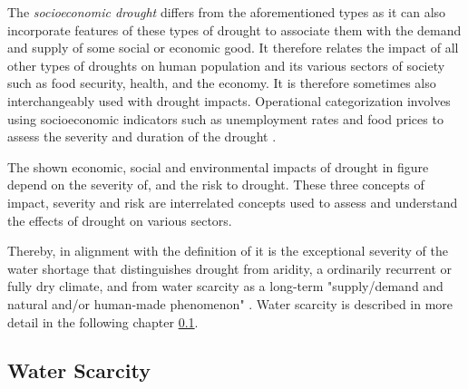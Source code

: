 The \textit{socioeconomic drought} differs from the aforementioned types as it can also incorporate features of these types of drought to associate them with the demand and supply of some social or economic good. It therefore relates the impact of all other types of droughts on human population and its various sectors of society such as food security, health, and the economy. It is therefore sometimes also interchangeably used with drought impacts. Operational categorization involves using socioeconomic indicators such as unemployment rates and food prices to assess the severity and duration of the drought \autocite{nationaldroughtmitigationcenterTypesDrought,wilhiteUnderstandingDroughtPhenomenon1985}.


The shown economic, social and environmental impacts of drought in figure  depend on the severity of, and the risk to drought. These three concepts of impact, severity and risk are interrelated concepts used to assess and understand the effects of drought on various sectors. 



Thereby, in alignment with the definition of \autocite{vanloonDroughtHumanmodifiedWorld2016} it is the exceptional severity of the water shortage that distinguishes drought from aridity, a ordinarily recurrent or fully dry climate, and from water scarcity as a long-term "supply/demand and natural and/or human-made phenomenon" \autocites[7]{idmpDroughtWaterScarcity2022}{vereintenationenSpecialReportDrought2021, vanClimatologicalRiskDroughts2017}. Water scarcity is described in more detail in the following chapter \ref*{subsec:water_scarcity}.



\subsection{Water Scarcity}\label{subsec:water_scarcity}

